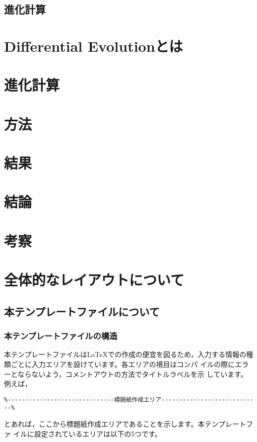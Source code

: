 \documentclass[a4paper,11pt,oneside,openany]{jsbook}
\begin{document}
\section{進化計算}
\chapter{Differential Evolutionとは}
\chapter{進化計算}
\chapter{方法}

\chapter{結果}

\chapter{結論}

\chapter{考察}

\chapter{全体的なレイアウトについて}

\section{本テンプレートファイルについて}
\subsection{本テンプレートファイルの構造}
本テンプレートファイルは\LaTeX{}での作成の便宜を図るため，入力する情報の種
類ごとに入力エリアを設けています。各エリアの境目はコンパ
イルの際にエラーとならないよう，コメントアウトの方法でタイトルラベルを示
しています。
例えば，
\begin{verbatim}
%------------------------------標題紙作成エリア----------------------------%  
\end{verbatim}
とあれば，ここから標題紙作成エリアであることを示します。本テンプレートファ
イルに設定されているエリアは以下の5つです。
\end{document}
